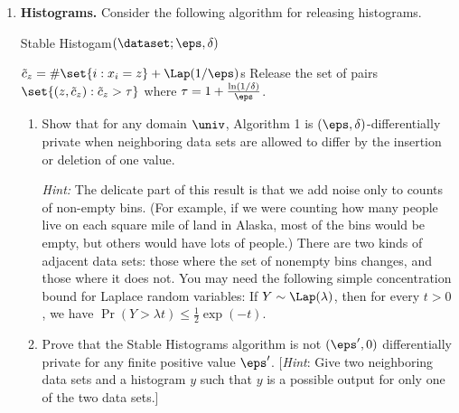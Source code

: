 \documentclass[11pt]{article}
\begin{document}
\begin{enumerate}[leftmargin=\parindent, itemsep=3ex]
\item         \textbf{Histograms.}
  Consider the following algorithm for releasing histograms.
  
  \begin{algorithm}[H]
  	\DontPrintSemicolon
    \caption{Stable Histogam$(\dataset; \eps,\delta)$}
    {
      $\tilde c_z = \#\set{i: x_i =z} + \Lap(1/\eps)$s
    }
    Release the set of pairs $\set{(z, \tilde c_z) : \tilde c_z >
      \tau}$ where $\tau = 1+ \frac{\ln(1/\delta)}{\eps}$. 
  \end{algorithm}

  \begin{enumerate}
  \item Show that for any domain $\univ$, Algorithm 1 is
    $(\eps,\delta)$-differentially private when neighboring data sets
    are allowed to differ by the insertion or deletion of one value.

  
    \emph{Hint:} The delicate part of this result is that we add noise
    only to counts of non-empty bins. (For example, if we were
    counting how many people live on each square mile of land in
    Alaska, most of the bins would be empty, but others would have
    lots of people.) There are two kinds of adjacent data sets: those
    where the set of nonempty bins changes, and those where it does
    not.  You may need the following simple concentration bound for
    Laplace random variables: If $Y\sim\Lap(\lambda)$, then for every
    $t>0$, we have $\Pr( Y >\lambda t ) \leq \frac 1 2 \exp(-t)$.
  

    \item Prove that the Stable Histograms
    algorithm is not $(\eps',0)$ differentially private for any finite
    positive value $\eps'$. [\emph{Hint}: Give two neighboring data sets and
    a histogram $y$ such that $y$ is  a possible output for only one of
    the two data sets.]
  \end{enumerate}

\end{enumerate}
\end{document}
